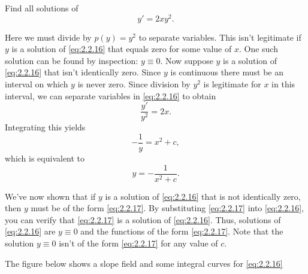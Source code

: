 \documentclass{ximera}
\begin{document}
\begin{example}\label{example:2.2.4}
Find all solutions of
\begin{equation} \label{eq:2.2.16}
y'=2xy^2.
\end{equation}
 
\begin{explanation}
Here we must divide by $p(y)=y^2$ to separate variables.
This isn't  legitimate if $y$ is a solution of \eqref{eq:2.2.16} that
equals zero for some value of $x$. One such solution can be found by
inspection:  $y \equiv 0$. Now suppose   $y$ is a solution
of \eqref{eq:2.2.16} that isn't  identically zero. Since $y$ is continuous there must be an interval on which $y$ is never zero. Since division
by $y^2$ is legitimate for $x$ in this interval, we can separate
variables in \eqref{eq:2.2.16} to obtain
$$
\frac{y'}{y^2}=2x.
$$
 Integrating this yields
$$
-\frac{1}{y}=x^2+c,
$$
which is equivalent to
\begin{equation} \label{eq:2.2.17}
y=-\frac{1}{x^2+c}.
\end{equation}
 
We've now shown that if $y$ is a solution of \eqref{eq:2.2.16} that is
not identically zero, then $y$ must be of the form \eqref{eq:2.2.17}. By
substituting \eqref{eq:2.2.17} into \eqref{eq:2.2.16}, you can verify that
\eqref{eq:2.2.17} is  a solution of \eqref{eq:2.2.16}. Thus,
 solutions of \eqref{eq:2.2.16} are $y\equiv 0$ and the functions
of the form \eqref{eq:2.2.17}. Note that the solution $y\equiv 0$ isn't  of
the form \eqref{eq:2.2.17} for any value of $c$.
 
The figure below shows a slope field and some integral
curves for \eqref{eq:2.2.16}

 \begin{center}
\end{center}
 
\end{explanation}
\end{example}
 
\end{document}
